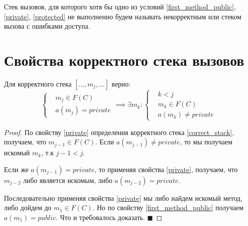 \documentclass[graybox]{svmult}
\begin{document}
\begin{definition}
Стек вызовов, для которого хотя бы одно из условий \ref{first_method_public}, \ref{private}, \ref{protected} не выполненно будем называть некорректным или стеком вызова с ошибками доступа.
\end{definition}

\section{Свойства корректного стека вызовов}
\label{sec:2}

\begin{theorem}
\label{not_private_before_private}
Для корректного стека $[\dots, m_j, \dots]$ верно:
\begin{equation}
	\left\{	
		\begin{aligned}
			&m_j \in F(C)\\
			&a(m_j) = private
		\end{aligned}
	\right.
	\implies
	\exists m_k: 
	\left\{
		\begin{aligned}
			&k < j \\
			&m_k \in F(C) \\
			&a(m_k) \neq private
		\end{aligned}
	\right.
\end{equation}
\end{theorem}
\begin{proof}
По свойству \ref{private} определения корректного стека \ref{correct_stack}, получаем, что $m_{j-1} \in F(C)$. Если $a(m_{j-1}) \neq private$, то мы получаем искомый $m_k$, т.к $j - 1 < j$.

Если же $a(m_{j-1}) = private$, то применяя свойства \ref{private}, получаем, что $m_{j-2}$ либо является искомым, либо $a(m_{j-2}) = private$.

Последовательно применяя свойства \ref{private} мы либо найдем искомый метод, либо дойдем до $m_1 \in F(C)$. Но по свойству \ref{first_method_public} получаем $a(m_1) = public$. 
Что и требовалось доказать. $\blacksquare$

\end{proof}
\end{document}
